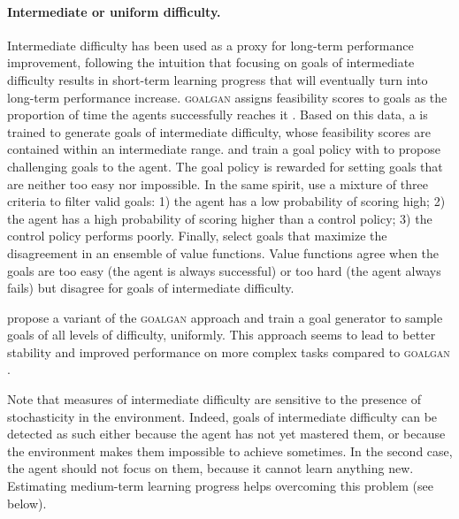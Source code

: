 \paragraph{Intermediate or uniform difficulty.} Intermediate difficulty has been used as a proxy for long-term performance improvement, following the intuition that focusing on goals of intermediate difficulty results in short-term learning progress that will eventually turn into long-term performance increase. \textsc{goalgan} assigns feasibility scores to goals as the proportion of time the agents successfully reaches it \cite{goalgan}. Based on this data, a \gan is trained to generate goals of intermediate difficulty, whose feasibility scores are contained within an intermediate range. \cite{sukhbaatar2017intrinsic} and \cite{campero2020learning} train a goal policy with \rl to propose challenging goals to the \rl agent. The goal policy is rewarded for setting goals that are neither too easy nor impossible. In the same spirit, \cite{team2021open} use a mixture of three criteria to filter valid goals: 1) the agent has a low probability of scoring high; 2) the agent has a high probability of scoring higher than a control policy; 3) the control policy performs poorly. Finally, \cite{zhang2020automatic} select goals that maximize the disagreement in an ensemble of value functions. Value functions agree when the goals are too easy (the agent is always successful) or too hard (the agent always fails) but disagree for goals of intermediate difficulty.

\cite{settersolver} propose a variant of the \textsc{goalgan} approach and train a goal generator to sample goals of all levels of difficulty, uniformly. This approach seems to lead to better stability and improved performance on more complex tasks compared to \textsc{goalgan} \cite{goalgan}.

Note that measures of intermediate difficulty are sensitive to the presence of stochasticity in the environment. Indeed, goals of intermediate difficulty can be detected as such either because the agent has not yet mastered them, or because the environment makes them impossible to achieve sometimes. In the second case, the agent should not focus on them, because it cannot learn anything new. Estimating medium-term learning progress helps overcoming this problem (see below).
 
 
